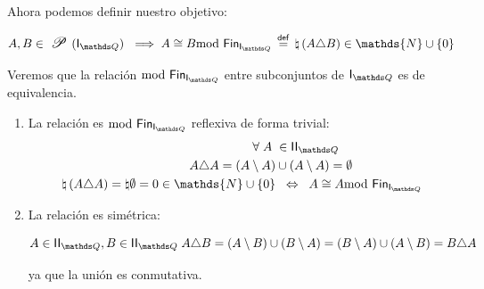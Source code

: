 \documentclass[final,12pt,a4paper,twoside,fleqn]{extbook}
\newcommand{\sthen}{\ensuremath{\Longrightarrow}}
\newcommand{\mathdef}{\ensuremath{\stackrel{\mathsf{def}}{{}={}}}}
\newcommand{\then}{\ensuremath{\sthen}}
\newcommand{\set}[1]{\ensuremath{\left\lbrace{#1}\right\rbrace}}
\newcommand{\setN}{\ensuremath{\mathds{N}}}
\theoremstyle{definition}
\theoremstyle{remark}
\begin{document}
\begin{enumerate}
{  
  
  Ahora podemos definir nuestro objetivo:
  
  
  
  \begin{equation}
  A , B \in \powset{\left( \IQ \right)} \;\then\; A \cong B \FinDiffRel 
  \mathdef  \natural \left( A \triangle B \right) \in \setN \cup \set{0}
  \end{equation}
  
  
  
  Veremos que la relación \( \FinDiffRel \) entre subconjuntos de \(\IQ\) 
  es de equivalencia.
  \begin{enumerate}
  \item { La relación es \( \FinDiffRel \) \textsf{reflexiva} de forma
  trivial:
  \begin{align}
  \forall \;A\; &\in \IIQ \\ 
  A \triangle A = \left( A \setminus A \right) &\cup \left( A \setminus A
  \right) = \emptyset \\ 
  \natural \left(A \triangle A \right) = \natural \emptyset = 0 \in \setN
  \cup \set{0} &\;\;\Leftrightarrow\;\; A \cong A \FinDiffRel
  \end{align}
  }
  
  
  
  \item { La relación es \textsf{simétrica}:
  
  
  
  \begin{equation}
  A \in \IIQ, B \in \IIQ \; A \triangle B = \left( A \setminus B \right)
  \cup \left( B \setminus A \right) =  \left( B \setminus A \right) \cup
  \left( A \setminus B \right) = B \triangle A
  \end{equation}
  
  
  
  	ya que la unión es conmutativa.
  }
  
  
  

\end{enumerate}}
\end{enumerate}
\end{document}
